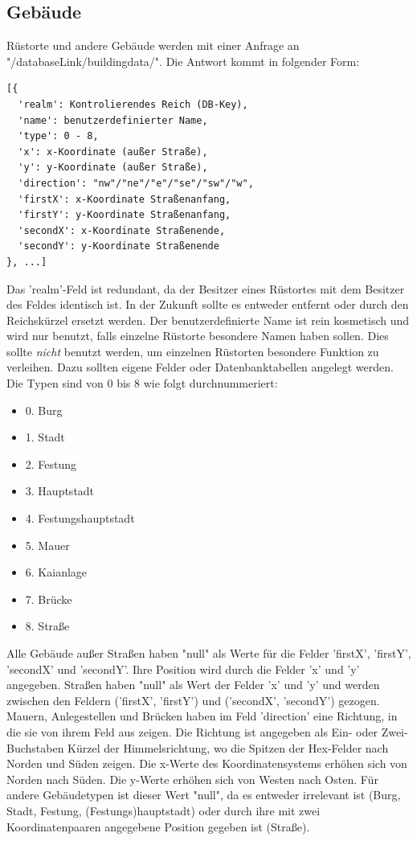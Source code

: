 \documentclass[11pt,a4paper,twocolumn]{article}
\begin{document}
\subsection{Gebäude}\label{ss:read_buildings}
Rüstorte und andere Gebäude werden mit einer Anfrage an "/databaseLink/buildingdata/". Die Antwort kommt in folgender Form:
\begin{lstlisting}
[{
  'realm': Kontrolierendes Reich (DB-Key),
  'name': benutzerdefinierter Name,
  'type': 0 - 8,
  'x': x-Koordinate (außer Straße),
  'y': y-Koordinate (außer Straße),
  'direction': "nw"/"ne"/"e"/"se"/"sw"/"w",
  'firstX': x-Koordinate Straßenanfang,
  'firstY': y-Koordinate Straßenanfang,
  'secondX': x-Koordinate Straßenende,
  'secondY': y-Koordinate Straßenende
}, ...]
\end{lstlisting}
Das 'realm'-Feld ist redundant, da der Besitzer eines Rüstortes mit dem Besitzer des Feldes identisch ist. In der Zukunft sollte es entweder entfernt oder durch den Reichskürzel ersetzt werden. Der benutzerdefinierte Name ist rein kosmetisch und wird nur benutzt, falls einzelne Rüstorte besondere Namen haben sollen. Dies sollte \emph{nicht} benutzt werden, um einzelnen Rüstorten besondere Funktion zu verleihen. Dazu sollten eigene Felder oder Datenbanktabellen angelegt werden. Die Typen sind von 0 bis 8 wie folgt durchnummeriert:
\begin{itemize}
	\item 0. Burg
	\item 1. Stadt
	\item 2. Festung
	\item 3. Hauptstadt
	\item 4. Festungshauptstadt
	\item 5. Mauer
	\item 6. Kaianlage
	\item 7. Brücke
	\item 8. Straße
\end{itemize} 
Alle Gebäude außer Straßen haben "null" als Werte für die Felder 'firstX', 'firstY', 'secondX' und 'secondY'. Ihre Position wird durch die Felder 'x' und 'y' angegeben. Straßen haben "null" als Wert der Felder 'x' und 'y' und werden zwischen den Feldern ('firstX', 'firstY') und ('secondX', 'secondY') gezogen.\\
Mauern, Anlegestellen und Brücken haben im Feld 'direction' eine Richtung, in die sie von ihrem Feld aus zeigen. Die Richtung ist angegeben als Ein- oder Zwei-Buchstaben Kürzel der Himmelsrichtung, wo die Spitzen der Hex-Felder nach Norden und Süden zeigen. Die x-Werte des Koordinatensystems erhöhen sich von Norden nach Süden. Die y-Werte erhöhen sich von Westen nach Osten. Für andere Gebäudetypen ist dieser Wert "null", da es entweder irrelevant ist (Burg, Stadt, Festung, (Festungs)hauptstadt) oder durch ihre mit zwei Koordinatenpaaren angegebene Position gegeben ist (Straße).
\end{document}
